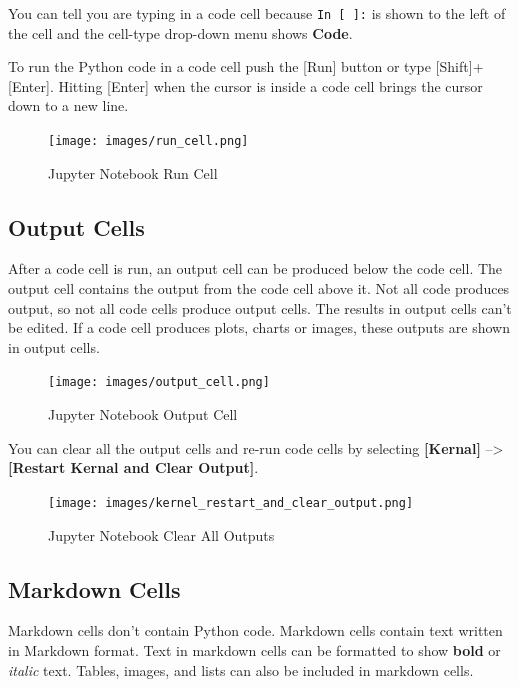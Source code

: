 \documentclass{book}
\begin{document}
You can tell you are typing in a code cell because \lstinline!In [ ]:!
is shown to the left of the cell and the cell-type drop-down menu shows
\textbf{Code}.

To run the Python code in a code cell push the {[}Run{]} button or type
{[}Shift{]}+{[}Enter{]}. Hitting {[}Enter{]} when the cursor is inside a
code cell brings the cursor down to a new line.

\begin{figure}
\centering
\texttt{[image: images/run\_cell.png]}
\caption{Jupyter Notebook Run Cell}
\end{figure}
    




    
        \subsection{Output Cells}\label{output-cells}

After a code cell is run, an output cell can be produced below the code
cell. The output cell contains the output from the code cell above it.
Not all code produces output, so not all code cells produce output
cells. The results in output cells can't be edited. If a code cell
produces plots, charts or images, these outputs are shown in output
cells.

\begin{figure}
\centering
\texttt{[image: images/output\_cell.png]}
\caption{Jupyter Notebook Output Cell}
\end{figure}

You can clear all the output cells and re-run code cells by selecting
\textbf{{[}Kernal{]}} --\textgreater{} \textbf{{[}Restart Kernal and
Clear Output{]}}.

\begin{figure}
\centering
\texttt{[image: images/kernel\_restart\_and\_clear\_output.png]}
\caption{Jupyter Notebook Clear All Outputs}
\end{figure}
    




    
        \subsection{Markdown Cells}\label{markdown-cells}

Markdown cells don't contain Python code. Markdown cells contain text
written in Markdown format. Text in markdown cells can be formatted to
show \textbf{bold} or \emph{italic} text. Tables, images, and lists can
also be included in markdown cells.
\end{document}
